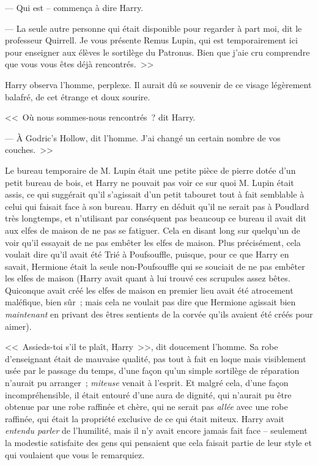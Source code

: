 --- Qui est -- commença à dire Harry.

--- La seule autre personne qui était disponible pour regarder à part moi, dit le professeur Quirrell. Je vous présente Remus Lupin, qui est temporairement ici pour enseigner aux élèves le sortilège du Patronus. Bien que j'aie cru comprendre que vous vous êtes déjà rencontrés.~>>

Harry observa l'homme, perplexe. Il aurait dû se souvenir de ce visage légèrement balafré, de cet étrange et doux sourire.

<<~Où nous sommes-nous rencontrés~? dit Harry.

--- À Godric's Hollow, dit l'homme. J'ai changé un certain nombre de vos couches.~>>

\later

Le bureau temporaire de M. Lupin était une petite pièce de pierre dotée d'un petit bureau de bois, et Harry ne pouvait pas voir ce sur quoi M. Lupin était assis, ce qui suggérait qu'il s'agissait d'un petit tabouret tout à fait semblable à celui qui faisait face à son bureau. Harry en déduit qu'il ne serait pas à Poudlard très longtemps, et n'utilisant par conséquent pas beaucoup ce bureau il avait dit aux elfes de maison de ne pas se fatiguer. Cela en disant long sur quelqu'un de voir qu'il essayait de ne pas embêter les elfes de maison. Plus précisément, cela voulait dire qu'il avait été Trié à Poufsouffle, puisque, pour ce que Harry en savait, Hermione était la seule non-Poufsouffle qui se souciait de ne pas embêter les elfes de maison (Harry avait quant à lui trouvé ces scrupules assez bêtes. Quiconque avait créé les elfes de maison en premier lieu avait été atrocement maléfique, bien sûr~; mais cela ne voulait pas dire que Hermione agissait bien \emph{maintenant} en privant des êtres sentients de la corvée qu'ils avaient été créés pour aimer).

<<~Assieds-toi s'il te plaît, Harry~>>, dit doucement l'homme. Sa robe d'enseignant était de mauvaise qualité, pas tout à fait en loque mais visiblement usée par le passage du temps, d'une façon qu'un simple sortilège de réparation n'aurait pu arranger~; \emph{miteuse} venait à l'esprit. Et malgré cela, d'une façon incompréhensible, il était entouré d'une aura de dignité, qui n'aurait pu être obtenue par une robe raffinée et chère, qui ne serait pas \emph{allée} avec une robe raffinée, qui était la propriété exclusive de ce qui était miteux. Harry avait \emph{entendu parler} de l'humilité, mais il n'y avait encore jamais fait face -- seulement la modestie satisfaite des gens qui pensaient que cela faisait partie de leur style et qui voulaient que vous le remarquiez.

